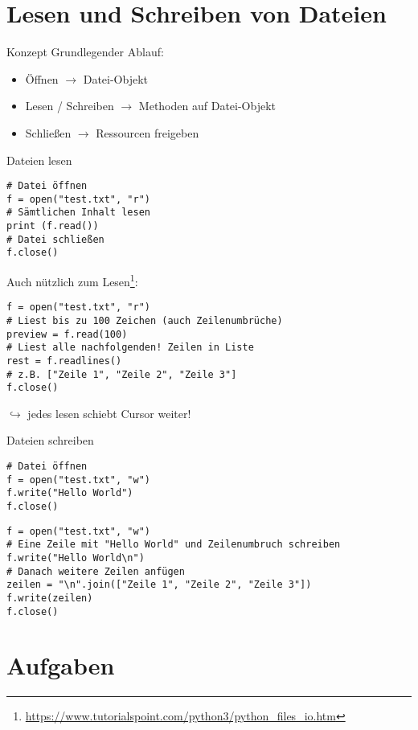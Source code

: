 \section{Lesen und Schreiben von Dateien}

\begin{frame}{Konzept}
	Grundlegender Ablauf:
    \begin{itemize}
        \item Öffnen $\rightarrow$ Datei-Objekt
        \item Lesen / Schreiben $\rightarrow$ Methoden auf Datei-Objekt
        \item Schließen $\rightarrow$ Ressourcen freigeben
    \end{itemize}
\end{frame}

\begin{frame}[fragile]{Dateien lesen}
    \begin{lstlisting}
# Datei öffnen
f = open("test.txt", "r")
# Sämtlichen Inhalt lesen
print (f.read())
# Datei schließen
f.close()\end{lstlisting}
    Auch nützlich zum Lesen\footnote{\url{https://www.tutorialspoint.com/python3/python_files_io.htm}}:
    \begin{lstlisting}
f = open("test.txt", "r")
# Liest bis zu 100 Zeichen (auch Zeilenumbrüche)
preview = f.read(100)
# Liest alle nachfolgenden! Zeilen in Liste
rest = f.readlines()
# z.B. ["Zeile 1", "Zeile 2", "Zeile 3"]
f.close()\end{lstlisting}
    $\hookrightarrow$ jedes lesen schiebt Cursor weiter!
\end{frame}

\begin{frame}[fragile]{Dateien schreiben}
    \begin{lstlisting}
# Datei öffnen
f = open("test.txt", "w")
f.write("Hello World")
f.close()
    \end{lstlisting}
    \begin{lstlisting}
f = open("test.txt", "w")
# Eine Zeile mit "Hello World" und Zeilenumbruch schreiben
f.write("Hello World\n")
# Danach weitere Zeilen anfügen
zeilen = "\n".join(["Zeile 1", "Zeile 2", "Zeile 3"])
f.write(zeilen)
f.close()
    \end{lstlisting}
\end{frame}


\section{Aufgaben}

